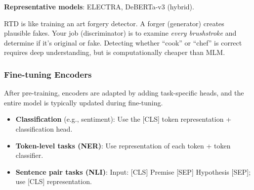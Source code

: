 \documentclass{article}
\begin{document}
\textbf{Representative models}: ELECTRA, DeBERTa-v3 (hybrid).

\begin{tcolorbox}[colback=yellow!5!white, colframe=orange!50!black, title=Intuition: The Forgery Detector]
RTD is like training an art forgery detector. A forger (generator) creates plausible fakes. Your job (discriminator) is to examine \textit{every brushstroke} and determine if it's original or fake. Detecting whether ``cook'' or ``chef'' is correct requires deep understanding, but is computationally cheaper than MLM.
\end{tcolorbox}

\subsubsection{Fine-tuning Encoders}

After pre-training, encoders are adapted by adding task-specific heads, and the entire model is typically updated during fine-tuning.

\begin{itemize}
\item \textbf{Classification} (e.g., sentiment): Use the [CLS] token representation + classification head.
\item \textbf{Token-level tasks (NER)}: Use representation of each token + token classifier.
\item \textbf{Sentence pair tasks (NLI)}: Input: [CLS] Premise [SEP] Hypothesis [SEP]; use [CLS] representation.
\end{itemize}

\begin{center}
\end{center}
\end{document}
